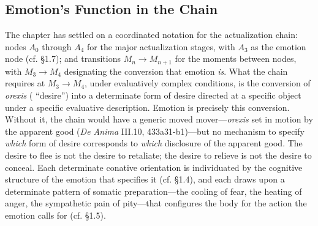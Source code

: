 \subsection{Emotion's Function in the Chain}

The chapter has settled on a coordinated notation for the actualization chain: nodes $A_0$ through $A_4$ for the major actualization stages, with $A_3$ as the emotion node (cf. \S 1.7); and transitions $M_n \rightarrow M_{n+1}$ for the moments between nodes, with $M_3 \rightarrow M_4$ designating the conversion that emotion \textit{is}. What the chain requires at $M_3 \rightarrow M_4$, under evaluatively complex conditions, is the conversion of \textit{orexis} ( ``desire'') into a determinate form of desire directed at a specific object under a specific evaluative description. Emotion is precisely this conversion. Without it, the chain would have a generic moved mover---\textit{orexis} set in motion by the apparent good (\textit{De Anima} III.10, 433a31-b1)---but no mechanism to specify \textit{which} form of desire corresponds to \textit{which} disclosure of the apparent good. The desire to flee is not the desire to retaliate; the desire to relieve is not the desire to conceal. Each determinate conative orientation is individuated by the cognitive structure of the emotion that specifies it (cf. \S 1.4), and each draws upon a determinate pattern of somatic preparation---the cooling of fear, the heating of anger, the sympathetic pain of pity---that configures the body for the action the emotion calls for (cf. \S 1.5).


